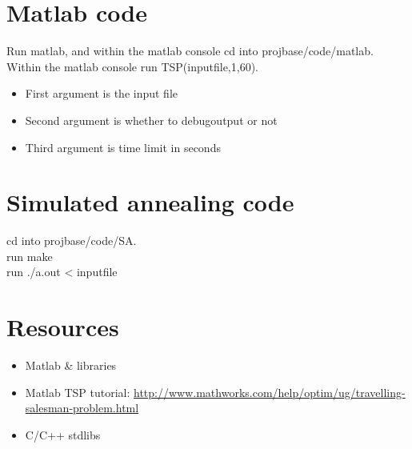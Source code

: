 \documentclass[11pt]{article}
\begin{document}
\section{Matlab code}
\label{sec-6}
Run matlab, and within the matlab console cd into projbase/code/matlab.\\
  Within the matlab console run TSP(inputfile,1,60).
\begin{itemize}
\item First argument is the input file
\item Second argument is whether to debugoutput or not
\item Third argument is time limit in seconds
\end{itemize}

\section{Simulated annealing code}
\label{sec-7}
cd into projbase/code/SA.\\
  run make\\
  run ./a.out < inputfile

\newpage
\section{Resources}
\label{sec-8}
\begin{itemize}
\item Matlab \& libraries
\item Matlab TSP tutorial: \url{http://www.mathworks.com/help/optim/ug/travelling-salesman-problem.html}
\item C/C++ stdlibs
\end{itemize}
\end{document}
